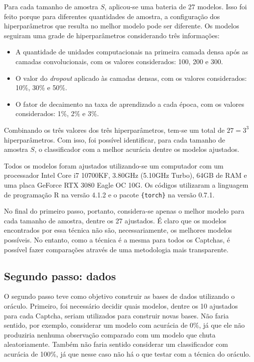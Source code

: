 \documentclass[12pt,twoside,brazilian]{book}
\providecommand{\tightlist}{%
  \setlength{\itemsep}{0pt}\setlength{\parskip}{0pt}}
\begin{document}
Para cada tamanho de amostra \(S\), aplicou-se uma bateria de 27
modelos. Isso foi feito porque para diferentes quantidades de amostra, a
configuração dos hiperparâmetros que resulta no melhor modelo pode ser
diferente. Os modelos seguiram uma grade de hiperparâmetros considerando
três informações:

\begin{itemize}
\tightlist
\item
  A quantidade de unidades computacionais na primeira camada densa após
  as camadas convolucionais, com os valores considerados: 100, 200 e
  300.
\item
  O valor do \emph{dropout} aplicado às camadas densas, com os valores
  considerados: 10\%, 30\% e 50\%.
\item
  O fator de decaimento na taxa de aprendizado a cada época, com os
  valores considerados: 1\%, 2\% e 3\%.
\end{itemize}

Combinando os três valores dos três hiperparâmetros, tem-se um total de
\(27=3^3\) hiperparâmetros. Com isso, foi possível identificar, para
cada tamanho de amostra \(S\), o classificador com a melhor acurácia
dentre os modelos ajustados.

Todos os modelos foram ajustados utilizando-se um computador com um
processador Intel Core i7 10700KF, 3.80GHz (5.10GHz Turbo), 64GB de RAM
e uma placa GeForce RTX 3080 Eagle OC 10G. Os códigos utilizaram a
linguagem de programação R na versão 4.1.2 e o pacote \texttt{\{torch\}}
na versão 0.7.1.

No final do primeiro passo, portanto, considera-se apenas o melhor
modelo para cada tamanho de amostra, dentre os 27 ajustados. É claro que
os modelos encontrados por essa técnica não são, necessariamente, os
melhores modelos possíveis. No entanto, como a técnica é a mesma para
todos os Captchas, é possível fazer comparações através de uma
metodologia mais transparente.

\hypertarget{segundo-passo-dados}{%
\subsection{Segundo passo: dados}\label{segundo-passo-dados}}

O segundo passo teve como objetivo construir as bases de dados
utilizando o oráculo. Primeiro, foi necessário decidir quais modelos,
dentre os 10 ajustados para cada Captcha, seriam utilizados para
construir novas bases. Não faria sentido, por exemplo, considerar um
modelo com acurácia de 0\%, já que ele não produziria nenhuma observação
comparado com um modelo que chuta aleatoriamente. Também não faria
sentido considerar um classificador com acurácia de 100\%, já que nesse
caso não há o que testar com a técnica do oráculo.
\end{document}
